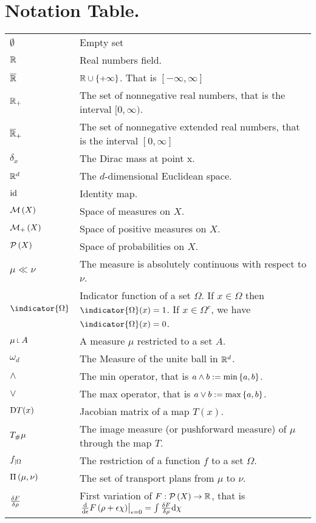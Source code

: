 \chapter*{Notation Table.}
\begin{tabular}{ l l }
	$\emptyset$ & Empty set \\
	$\mathbb{R}$ & Real numbers field. \\ 
	$\overline{\mathbb{R}}$ & $ \mathbb{R} \cup \left\lbrace +\infty \right\rbrace$. That is $[-\infty, \infty]$ \\
	$\mathbb{R}_+ $ & The set of nonnegative real numbers, that is the interval $[0, \infty)$.\\
	$\overline{\mathbb{R}}_+$ & The set of nonnegative extended real numbers, that is the interval $[0, \infty]$\\
	$\delta_x$ & The Dirac mass at point x. \\
	$\mathbb{R}^d $ & The $d$-dimensional Euclidean space.\\
	$\mathrm{id}$ & Identity map.\\
	$\mathcal{M}\left( X \right)$ & Space of measures on $X$. \\
	$\mathcal{M}_+\left( X \right)$ & Space of positive measures on $X$. \\
	$\mathcal{P}\left( X \right)$ & Space of probabilities on $X$. \\	
	$\mu \ll\nu$ & The measure is absolutely continuous with respect to $\nu$. \\
	$\indicator{\Omega} $ & Indicator function of a set $\Omega$. If $x\in \Omega$ then $\indicator{\Omega}(x)=1$. If $x\in \Omega^c$, we have $\indicator{\Omega}(x)=0$.\\
	$\mu \measurerestr A$ & A measure $\mu$ restricted to a set $A$.\\
	$\omega_d$ & The Measure of the unite ball in $\mathbb{R}^d$. \\
	$\wedge$ & The min operator, that is $a\wedge b:=\min\left\lbrace a,b \right\rbrace$. \\
	$\vee$ & The max operator, that is $a\vee b:=\max\left\lbrace a,b \right\rbrace$. \\
	$\mathrm{D} T(x)$ & Jacobian matrix of a map $T(x)$. \\
	${T}_{\#} \mu$ &  The image measure (or pushforward measure) of $\mu$ through the map $T$.\\
	${f}_{\left| \Omega \right.}$ & The restriction of a function $f$ to a set $\Omega$. \\
	$\Pi\left(\mu, \nu\right)$ & The set of transport plans from $\mu$ to $\nu$.\\
	$\frac{\delta F}{\delta \rho}$ &  First variation of $F:\mathcal{P}\left( X \right) \rightarrow \mathbb{R}$, that is $\left.\frac{\mathrm{d}}{\mathrm{d}\epsilon}F\left(\rho +\epsilon\chi\right)\right|_{\epsilon=0}=\int\frac{\delta F}{\delta \rho}\mathrm{d}\chi$\\

\end{tabular}
